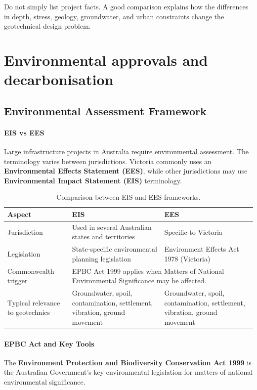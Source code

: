 \begin{keybox}
Do not simply list project facts. A good comparison explains how the differences in depth, stress, geology, groundwater, and urban constraints change the geotechnical design problem.
\end{keybox}

\section{Environmental approvals and decarbonisation}
\label{sec:environmental-approvals-and-decarbonisation}

\subsection{Environmental Assessment Framework}

\paragraph{EIS vs EES}
Large infrastructure projects in Australia require environmental assessment. The terminology varies between jurisdictions. Victoria commonly uses an \textbf{Environmental Effects Statement (EES)}, while other jurisdictions may use \textbf{Environmental Impact Statement (EIS)} terminology.

\begin{table}[H]
\centering
\small
\begin{tabularx}{\textwidth}{l X X}
\toprule
\textbf{Aspect} & \textbf{EIS} & \textbf{EES} \\
\midrule
Jurisdiction & Used in several Australian states and territories & Specific to Victoria \\
Legislation & State-specific environmental planning legislation & Environment Effects Act 1978 (Victoria) \\
Commonwealth trigger & \multicolumn{2}{X}{EPBC Act 1999 applies when Matters of National Environmental Significance may be affected.} \\
Typical relevance to geotechnics & Groundwater, spoil, contamination, settlement, vibration, ground movement & Groundwater, spoil, contamination, settlement, vibration, ground movement \\
\bottomrule
\end{tabularx}
\caption{Comparison between EIS and EES frameworks.}
\end{table}

\paragraph{EPBC Act and Key Tools}
The \textbf{Environment Protection and Biodiversity Conservation Act 1999} is the Australian Government's key environmental legislation for matters of national environmental significance.

